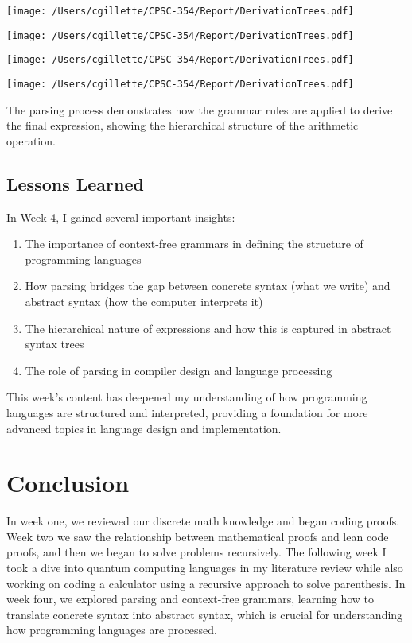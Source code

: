 \documentclass{article}
\begin{document}
\texttt{[image: /Users/cgillette/CPSC-354/Report/DerivationTrees.pdf]}

\texttt{[image: /Users/cgillette/CPSC-354/Report/DerivationTrees.pdf]}

\texttt{[image: /Users/cgillette/CPSC-354/Report/DerivationTrees.pdf]}

\texttt{[image: /Users/cgillette/CPSC-354/Report/DerivationTrees.pdf]}

The parsing process demonstrates how the grammar rules are applied to derive the final expression, showing the hierarchical structure of the arithmetic operation.

\subsection*{Lessons Learned}

In Week 4, I gained several important insights:

\begin{enumerate}
    \item The importance of context-free grammars in defining the structure of programming languages
    \item How parsing bridges the gap between concrete syntax (what we write) and abstract syntax (how the computer interprets it)
    \item The hierarchical nature of expressions and how this is captured in abstract syntax trees
    \item The role of parsing in compiler design and language processing
\end{enumerate}

This week's content has deepened my understanding of how programming languages are structured and interpreted, providing a foundation for more advanced topics in language design and implementation.

\section*{Conclusion}
In week one, we reviewed our discrete math knowledge and began coding proofs. Week two we saw the relationship between mathematical proofs and lean code proofs, and then we began to solve problems recursively. The following week I took a dive into quantum computing languages in my literature review while also working on coding a calculator using a recursive approach to solve parenthesis. In week four, we explored parsing and context-free grammars, learning how to translate concrete syntax into abstract syntax, which is crucial for understanding how programming languages are processed.
\end{document}
